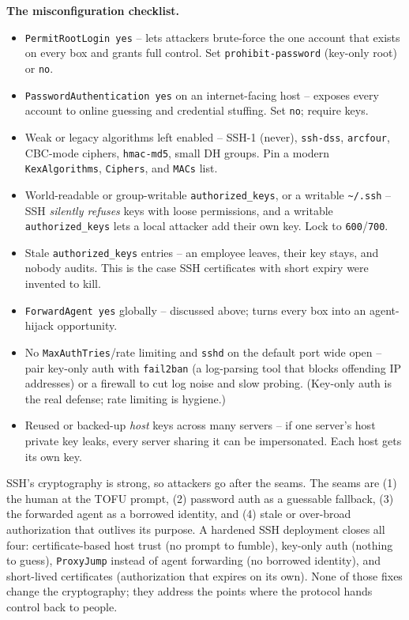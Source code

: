 \begin{attackbox}
\textbf{The misconfiguration checklist.}
\begin{itemize}
  \item \texttt{PermitRootLogin yes} -- lets attackers brute-force the one account that exists on every box and grants full control. Set \texttt{prohibit-password} (key-only root) or \texttt{no}.
  \item \texttt{PasswordAuthentication yes} on an internet-facing host -- exposes every account to online guessing and credential stuffing. Set \texttt{no}; require keys.
  \item Weak or legacy algorithms left enabled -- SSH-1 (never), \texttt{ssh-dss}, \texttt{arcfour}, CBC-mode ciphers, \texttt{hmac-md5}, small DH groups. Pin a modern \texttt{KexAlgorithms}, \texttt{Ciphers}, and \texttt{MACs} list.
  \item World-readable or group-writable \texttt{authorized\_keys}, or a writable \texttt{\textasciitilde/.ssh} -- SSH \emph{silently refuses} keys with loose permissions, and a writable \texttt{authorized\_keys} lets a local attacker add their own key. Lock to \texttt{600}/\texttt{700}.
  \item Stale \texttt{authorized\_keys} entries -- an employee leaves, their key stays, and nobody audits. This is the case SSH certificates with short expiry were invented to kill.
  \item \texttt{ForwardAgent yes} globally -- discussed above; turns every box into an agent-hijack opportunity.
  \item No \texttt{MaxAuthTries}/rate limiting and \texttt{sshd} on the default port wide open -- pair key-only auth with \texttt{fail2ban} (a log-parsing tool that blocks offending IP addresses) or a firewall to cut log noise and slow probing. (Key-only auth is the real defense; rate limiting is hygiene.)
  \item Reused or backed-up \emph{host} keys across many servers -- if one server's host private key leaks, every server sharing it can be impersonated. Each host gets its own key.
\end{itemize}
\end{attackbox}

\begin{intuitionbox}
SSH's cryptography is strong, so attackers go after the seams. The seams are (1) the human at the TOFU prompt, (2) password auth as a guessable fallback, (3) the forwarded agent as a borrowed identity, and (4) stale or over-broad authorization that outlives its purpose. A hardened SSH deployment closes all four: certificate-based host trust (no prompt to fumble), key-only auth (nothing to guess), \texttt{ProxyJump} instead of agent forwarding (no borrowed identity), and short-lived certificates (authorization that expires on its own). None of those fixes change the cryptography; they address the points where the protocol hands control back to people.
\end{intuitionbox}

